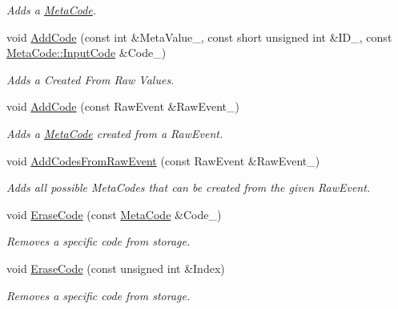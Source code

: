 \begin{DoxyCompactItemize}
\begin{DoxyCompactList}\small\item\em Adds a \hyperlink{classMetaCode}{MetaCode}. \item\end{DoxyCompactList}\item 
void \hyperlink{classPhysEventUserInput_ace3b98a502b8e784b58bc5dc599fc0c4}{AddCode} (const int \&MetaValue\_\-, const short unsigned int \&ID\_\-, const \hyperlink{classMetaCode_a7390e6f58e25c0ce377bba4e63081b24}{MetaCode::InputCode} \&Code\_\-)
\begin{DoxyCompactList}\small\item\em Adds a Created From Raw Values. \item\end{DoxyCompactList}\item 
void \hyperlink{classPhysEventUserInput_a385a4f7a6e88be43b6ba1ffc2a1bb5e3}{AddCode} (const RawEvent \&RawEvent\_\-)
\begin{DoxyCompactList}\small\item\em Adds a \hyperlink{classMetaCode}{MetaCode} created from a RawEvent. \item\end{DoxyCompactList}\item 
void \hyperlink{classPhysEventUserInput_a9e42f42f9a4a42f792e5cf95856669c0}{AddCodesFromRawEvent} (const RawEvent \&RawEvent\_\-)
\begin{DoxyCompactList}\small\item\em Adds all possible MetaCodes that can be created from the given RawEvent. \item\end{DoxyCompactList}\item 
void \hyperlink{classPhysEventUserInput_a1dbd2996770df334fba9f67d9bb4ffa0}{EraseCode} (const \hyperlink{classMetaCode}{MetaCode} \&Code\_\-)
\begin{DoxyCompactList}\small\item\em Removes a specific code from storage. \item\end{DoxyCompactList}\item 
void \hyperlink{classPhysEventUserInput_a8cbbee3c2be3bd12746ad442fce526e4}{EraseCode} (const unsigned int \&Index)
\begin{DoxyCompactList}\small\item\em Removes a specific code from storage. \item\end{DoxyCompactList}\item 

\end{DoxyCompactItemize}
